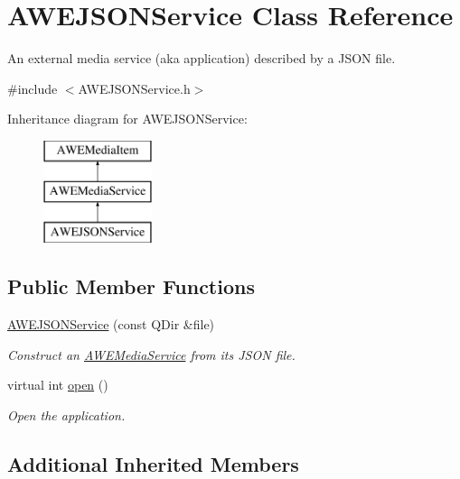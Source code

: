 \hypertarget{class_a_w_e_j_s_o_n_service}{\section{A\-W\-E\-J\-S\-O\-N\-Service Class Reference}
\label{class_a_w_e_j_s_o_n_service}
}


An external media service (aka application) described by a J\-S\-O\-N file.  




{\ttfamily \#include $<$A\-W\-E\-J\-S\-O\-N\-Service.\-h$>$}

Inheritance diagram for A\-W\-E\-J\-S\-O\-N\-Service\-:\begin{figure}[H]
\begin{center}
\leavevmode
\includegraphics[height=3.000000cm]{class_a_w_e_j_s_o_n_service}
\end{center}
\end{figure}
\subsection*{Public Member Functions}
\begin{DoxyCompactItemize}
\item 
\hyperlink{class_a_w_e_j_s_o_n_service_adae51c33cd1c29a646c046cc843f872c}{A\-W\-E\-J\-S\-O\-N\-Service} (const Q\-Dir \&file)
\begin{DoxyCompactList}\small\item\em Construct an \hyperlink{class_a_w_e_media_service}{A\-W\-E\-Media\-Service} from its J\-S\-O\-N file. \end{DoxyCompactList}\item 
virtual int \hyperlink{class_a_w_e_j_s_o_n_service_a14077410ff1b31ad0b28589ff4fb5a49}{open} ()
\begin{DoxyCompactList}\small\item\em Open the application. \end{DoxyCompactList}\end{DoxyCompactItemize}
\subsection*{Additional Inherited Members}


